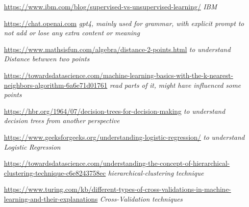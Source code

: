 \documentclass[11pt, a4paper]{article}
\begin{document}
\newpage
\begin{thebibliography}{1}
  \url{https://www.ibm.com/blog/supervised-vs-unsupervised-learning/}
  \textit{IBM}

  \url{https://chat.openai.com}
  \textit{gpt4, mainly used for grammar, with explicit prompt to not add or lose any extra content or meaning}

  \url{https://www.mathsisfun.com/algebra/distance-2-points.html}
  \textit{to understand Distance betwwen two points}

  \url{https://towardsdatascience.com/machine-learning-basics-with-the-k-nearest-neighbors-algorithm-6a6e71d01761}
  \textit{read parts of it, might have influenced some points}

  \url{https://hbr.org/1964/07/decision-trees-for-decision-making}
  \textit{to understand decision trees from another perspective}

  \url{https://www.geeksforgeeks.org/understanding-logistic-regression/}
  \textit{to understand Logistic Regression}

  \url{https://towardsdatascience.com/understanding-the-concept-of-hierarchical-clustering-technique-c6e8243758ec}
  \textit{hierarchical-clustering technique}

  \url{https://www.turing.com/kb/different-types-of-cross-validations-in-machine-learning-and-their-explanations}
  \textit{Cross-Validation techniques}

\end{thebibliography}
\end{document}
